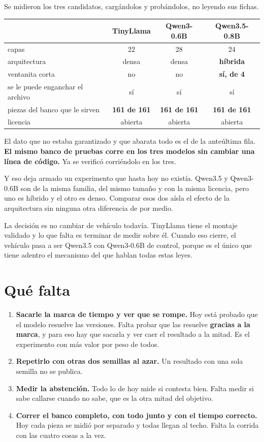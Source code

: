 \documentclass[11pt,a4paper]{article}
\newcommand{\destacado}[1]{%
  \par\medskip\noindent\colorbox{grisc}{\parbox{\dimexpr\linewidth-2\fboxsep}{%
  \vspace{2pt}#1\vspace{2pt}}}\par\medskip}
\begin{document}
Se midieron los tres candidatos, cargándolos y probándolos, no leyendo sus fichas.

\begin{center}\small\sffamily
\begin{tabular}{lccc}
\toprule
 & TinyLlama & Qwen3-0.6B & Qwen3.5-0.8B \\
\midrule
capas & 22 & 28 & 24 \\
arquitectura & densa & densa & \textbf{híbrida} \\
ventanita corta & no & no & \textbf{sí, de 4} \\
se le puede enganchar el archivo & sí & sí & sí \\
piezas del banco que le sirven & \textbf{161 de 161} & \textbf{161 de 161} & \textbf{161 de 161} \\
licencia & abierta & abierta & abierta \\
\bottomrule
\end{tabular}
\end{center}

El dato que no estaba garantizado y que abarata todo es el de la anteúltima fila. \textbf{El mismo
banco de pruebas corre en los tres modelos sin cambiar una línea de código.} Ya se verificó
corriéndolo en los tres.

Y eso deja armado un experimento que hasta hoy no existía. Qwen3.5 y Qwen3-0.6B son de la misma
familia, del mismo tamaño y con la misma licencia, pero uno es híbrido y el otro es denso. Comparar
esos dos aísla el efecto de la arquitectura sin ninguna otra diferencia de por medio.

\destacado{La decisión es no cambiar de vehículo todavía. TinyLlama tiene el montaje validado y lo
que falta es terminar de medir sobre él. Cuando eso cierre, el vehículo pasa a ser Qwen3.5 con
Qwen3-0.6B de control, porque es el único que tiene adentro el mecanismo del que hablan todas estas
leyes.}

\section{Qué falta}

\begin{enumerate}[leftmargin=1.6em,itemsep=5pt]
\item \textbf{Sacarle la marca de tiempo y ver que se rompe.} Hoy está probado que el modelo resuelve
las versiones. Falta probar que las resuelve \textbf{gracias a la marca}, y para eso hay que sacarla
y ver caer el resultado a la mitad. Es el experimento con más valor por peso de todos.
\item \textbf{Repetirlo con otras dos semillas al azar.} Un resultado con una sola semilla no se
publica.
\item \textbf{Medir la abstención.} Todo lo de hoy mide si contesta bien. Falta medir si sabe callarse
cuando no sabe, que es la otra mitad del objetivo.
\item \textbf{Correr el banco completo, con todo junto y con el tiempo correcto.} Hoy cada pieza
se midió por separado y todas llegan al techo. Falta la corrida con las cuatro cosas a la vez.
\end{enumerate}
\end{document}
